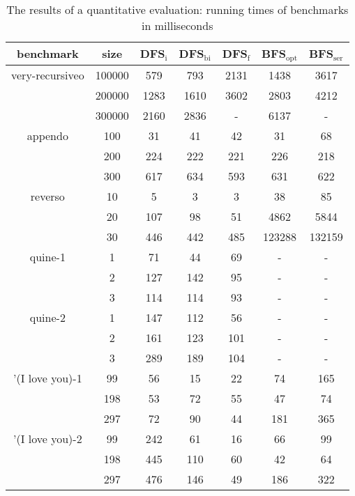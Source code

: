 \documentclass[format=acmlarge, review=true, authordraft=true]{acmart}
\begin{document}
\begin{table}
	\begin{tabular}{|c|c|c|c|c|c|c|}
		\hline 
		benchmark & size & DFS$_\textrm{i}$ & DFS$_\textrm{bi}$ & DFS$_\textrm{f}$ & BFS$_\textrm{opt}$ & BFS$_\textrm{ser}$  
		\\
		\hline
		very-recursiveo & 100000 &  579 &  793 & 2131 & 1438 & 3617 \\
		& 200000 & 1283 & 1610 & 3602 & 2803 & 4212 \\
		& 300000 & 2160 & 2836 &    - & 6137 &    - \\
		\hline 
		appendo  & 100 &  31 &  41 &  42 &  31 &  68 \\ 
		& 200 & 224 & 222 & 221 & 226 & 218 \\ 
		& 300 & 617 & 634 & 593 & 631 & 622 \\ 
		\hline 
		reverso & 10 &   5 &   3 &   3 &     38 &     85 \\ 
		& 20 & 107 &  98 &  51 &   4862 &   5844 \\
		& 30 & 446 & 442 & 485 & 123288 & 132159 \\ 
		\hline
		quine-1 & 1 &  71 &  44 & 69 & - & - \\ 
		& 2 & 127 & 142 & 95 & - & - \\ 
		& 3 & 114 & 114 & 93 & - & - \\ 
		\hline
		quine-2 & 1 & 147 & 112 &  56 & - & - \\ 
		& 2 & 161 & 123 & 101 & - & - \\ 
		& 3 & 289 & 189 & 104 & - & - \\ 
		\hline 
		'(I love you)-1 &  99 & 56 & 15 & 22 &  74 & 165 \\ 
		& 198 & 53 & 72 & 55 &  47 &  74 \\
		& 297 & 72 & 90 & 44 & 181 & 365 \\ 
		\hline
		'(I love you)-2 &  99 & 242 &  61 & 16 &  66 &  99 \\ 
		& 198 & 445 & 110 & 60 &  42 &  64 \\
		& 297 & 476 & 146 & 49 & 186 & 322 \\ 
		\hline 
	\end{tabular}
	\caption{The results of a quantitative evaluation: running times of 
	benchmarks 
		in milliseconds}
	\label{compare-efficiency}
\end{table}
\end{document}
